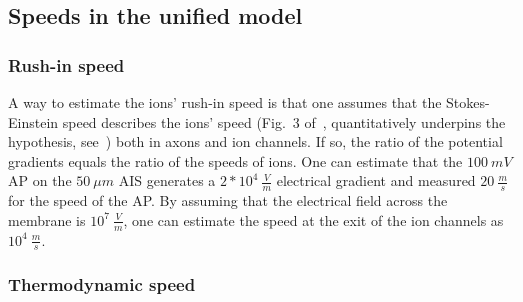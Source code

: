 \subsection[Speeds]{Speeds in the unified model\label{sec:Physics-UnifiedSpeed}}


\subsubsection[Rush-in speed]{Rush-in speed\label{sec:Physics-RushInSpeed}}
{ %
	A way to estimate the ions' rush-in speed is 
	that one assumes that the Stokes-Einstein speed describes
	the ions' speed (Fig.~3 of~\cite{HodgkinHuxley:1952}, quantitatively underpins the hypothesis, see~\cite{VeghStokesEinstein:2026}) both in axons and ion channels. If so,
	the ratio of the potential gradients equals the ratio of the 
	speeds of ions. One can estimate that the $100~mV$ \gls{AP} on the 
	$50~\mu m$ \gls{AIS} generates a $2*10^4~\frac{V}{m}$ electrical gradient and 
	\cite{HodgkinHuxley:1952} measured $20~\frac{m}{s}$ for the speed of the \gls{AP}. By assuming that the electrical field across the membrane is $10^7~\frac{V}{m}$, one can estimate the speed at the exit of the ion channels as $10^4~\frac{m}{s}$.
	}

\subsubsection[Thermodynamic speed]{Thermodynamic speed\label{sec:Physics-UnifiedThermodynamicSpeed}}



